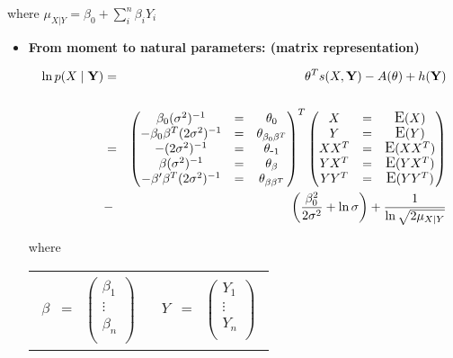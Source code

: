 \documentclass[11pt, oneside]{article}   	%
\DeclareMathOperator*{\E}{\mbox{\large E}}
\numberwithin{figure}{section}
\numberwithin{equation}{section}
\numberwithin{table}{section}
\theoremstyle{definition}
\begin{document}
\begin{appendices}
\begin{itemize}
where $\mu_{X|Y} = \beta_0+\sum_i^n{\beta_i Y_i}$

\begin{itemize}
\item \textbf{From moment to natural parameters: (matrix representation)}


\begin{eqnarray*}
\ln p(X \mid \mathbf{Y}) &=& \theta^T s(X,\mathbf{Y}) - A(\theta) + h(\mathbf{Y})\\\\
&=&
\begin{pmatrix}
\beta_0 (\sigma^2)^{-1} &=& \theta_{0} \\
-\beta_0 \beta^T (2\sigma^2)^{-1} &=& \theta_{\beta_0 \beta^T} \\
-(2\sigma^2)^{-1} &=& \theta_{\mbox{-}1} \\
\beta (\sigma^2)^{-1} &=& \theta_{\beta} \\
-\beta' \beta^T (2\sigma^2)^{-1} &=& \theta_{\beta \beta^T} \\
\end{pmatrix}^T
\begin{pmatrix}
X   &=& \E(X)\\
Y   &=& \E(Y)\\
XX^T   &=& \E(XX^T)\\
YX^T   &=& \E(YX^T)\\
YY^T   &=& \E(YY^T)\\
\end{pmatrix}
\\
&-& \left( \frac{\beta_0^2}{2\sigma^2} + \ln{\sigma}\right)  + \frac{1}{\ln{\sqrt{2\mu_{X|Y}}}}
\end{eqnarray*}

where

\begin{tabular}{p{4cm}p{4cm}}
\begin{eqnarray*}
\beta &=& 
\begin{pmatrix}
\beta_1\\
\vdots\\
\beta_n\\
\end{pmatrix}
\end{eqnarray*}
&
\begin{eqnarray*}
Y &=& 
\begin{pmatrix}
Y_1\\
\vdots\\
Y_n\\
\end{pmatrix}
\end{eqnarray*}
\\
\end{tabular}



\end{itemize}
\end{itemize}
\end{appendices}
\end{document}
